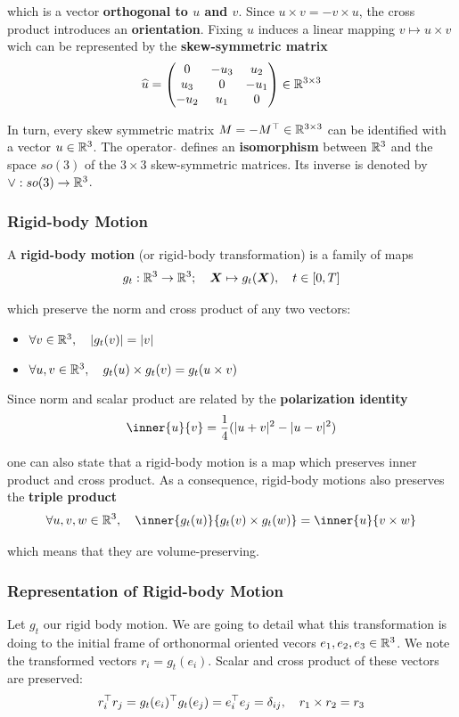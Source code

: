 which is a vector \textbf{orthogonal to $u$ and $v$}.
Since $u \times v = -v \times u$, the cross product introduces an \textbf{orientation}.
Fixing $u$ induces a linear mapping $v \mapsto u \times v$ wich
can be represented by the \textbf{skew-symmetric matrix}
\[\widehat{u} = \hatmat{u_1}{u_2}{u_3} \in \RR{3}{3}\]

In turn, every skew symmetric matrix $M = -\tr{M} \in \RR{3}{3}$
can be identified with a vector $u \in \R^3$.
The operator $\widehat{}$ defines an \textbf{isomorphism} between $\R^3$
and the space $so(3)$ of the $3 \times 3$ skew-symmetric matrices.
Its inverse is denoted by $\vee : so(3) \rightarrow \R^3$.


\subsubsection{Rigid-body Motion}%
\label{ssub:rigid_body_motion}

A \textbf{rigid-body motion} (or rigid-body transformation)
is a family of maps
\[g_t : \R^3 \rightarrow \R^3;\quad \bm{X} \mapsto g_t(\bm{X}),\quad t \in [0,T]\]

which preserve the norm and cross product of any two vectors:
\begin{itemize}
	\setlength\itemsep{-0.2em}
	\item $\forall v \in \R^3, \quad |g_t(v)| = |v|$
	\item $\forall u,v \in \R^3, \quad g_t(u) \times g_t(v) = g_t(u \times v)$
\end{itemize}

Since norm and scalar product are related by the \textbf{polarization identity}
\[\inner{u}{v} = \frac{1}{4}(|u+v|^2 - |u-v|^2)\]

one can also state that a rigid-body motion is a map which
preserves inner product and cross product.
As a consequence, rigid-body motions also preserves the \textbf{triple product}
\[\forall u, v, w \in \R^3, \quad
	\inner{g_t(u)}{g_t(v) \times g_t(w)} = \inner{u}{v \times w}\]

which means that they are volume-preserving.


\subsubsection{Representation of Rigid-body Motion}%
\label{ssub:representation_of_rigid_body_motion}

Let $g_t$ our rigid body motion. We are going to detail what this transformation
is doing to the initial frame of orthonormal oriented vecors
$e_1, e_2, e_3 \in \R^3$.
We note the transformed vectors $r_i = g_t(e_i)$.
Scalar and cross product of these vectors are preserved:
	\[\tr{r_i}r_j = \tr{g_t(e_i)}g_t(e_j) = \tr{e_i}e_j = \delta_{ij}, \quad
	r_1 \times r_2 = r_3\]

